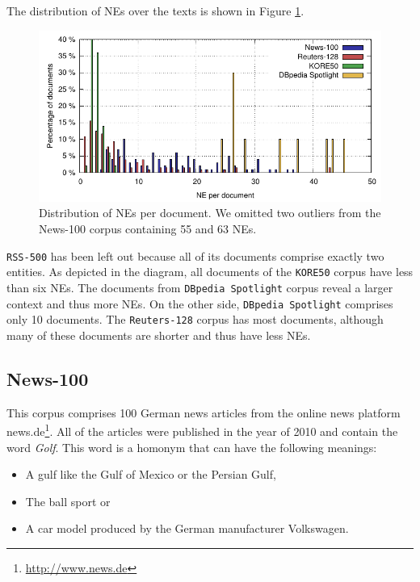 The distribution of NEs over the texts is shown in Figure \ref{n3:fig:nePerDoc}. 
\begin{figure}[htb!]
  \centering
  \includegraphics[width=\linewidth]{part_02/benchmarking/LREC_N3NIFNERNED/NE_per_doc.pdf}
  \caption{Distribution of NEs per document. We omitted two outliers from the News-100 corpus containing 55 and 63 NEs.}
  \label{n3:fig:nePerDoc}
\end{figure}

\texttt{RSS-500} has been left out because all of its documents comprise exactly two entities. 
As depicted in the diagram, all documents of the \texttt{KORE50} corpus have less than six NEs. 
The documents from \texttt{DBpedia Spotlight} corpus reveal a larger context and thus more NEs. 
On the other side, \texttt{DBpedia Spotlight} comprises only 10 documents.
The \texttt{Reuters-128} corpus has most documents, although many of these documents are shorter and thus have less NEs.



\subsection{News-100}

This corpus comprises 100 German news articles from the online news platform news.de\footnote{\url{http://www.news.de}}. 
All of the articles were published in the year of 2010 and contain the word \emph{Golf}.
This word is a homonym that can have the following meanings:
\begin{itemize}
\item A gulf like the Gulf of Mexico or the Persian Gulf,
\item The ball sport or
\item A car model produced by the German manufacturer Volkswagen.
\end{itemize}

